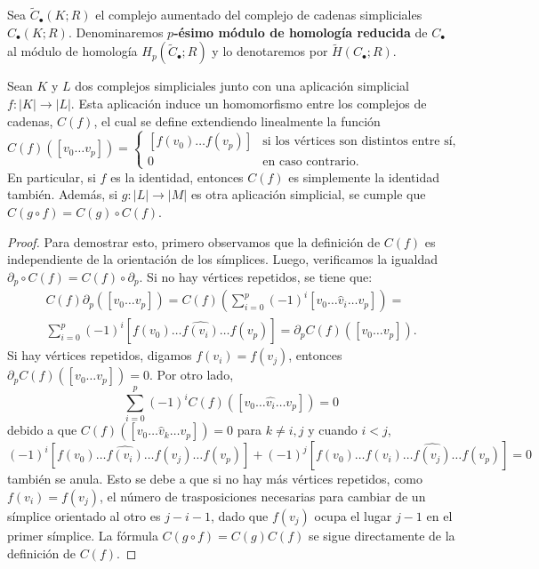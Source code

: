 \begin{definicion}
	Sea \(\widetilde{C}_{\bullet}(K;R)\) el complejo aumentado del complejo de cadenas
	simpliciales \(C_{\bullet}(K;R)\). Denominaremos \textbf{\(p\)-ésimo módulo de
	homología reducida} de \(C_{\bullet}\) al módulo de homología \(H_{p}(\widetilde{C}
	_{\bullet};R)\) y lo denotaremos por \(\widetilde{H}(C_{\bullet};R)\).
\end{definicion}

\begin{proposicion}
	\label{prop:simpl_app_hom} Sean \(K\) y \(L\) dos complejos simpliciales junto con
	una aplicación simplicial \(f: |K| \to |L|\). Esta aplicación induce un
	homomorfismo entre los complejos de cadenas, \(C(f)\), el cual se define
	extendiendo linealmente la función
	\[
		C(f)([v_{0} \ldots v_{p}]) =
		\begin{cases}
			[f(v_{0}) \ldots f(v_{p})] & \text{si los vértices son distintos entre sí}, \\
			0                         & \text{en caso contrario}.
		\end{cases}
	\]
	En particular, si \(f\) es la identidad, entonces \(C(f)\) es simplemente la
	identidad también. Además, si \(g: |L| \longrightarrow |M|\) es otra aplicación
	simplicial, se cumple que \(C(g \circ f) = C(g) \circ C(f)\).
\end{proposicion}
\begin{proof}
	Para demostrar esto, primero observamos que la definición de \(C(f)\) es
	independiente de la orientación de los símplices. Luego, verificamos la
	igualdad \(\partial_{p} \circ C(f) = C(f) \circ \partial_{p}\). Si no hay vértices
	repetidos, se tiene que:
	\begin{gather*}
		C(f) \partial_{p}([v_{0} \ldots v_{p}]) = C(f) \left( \sum_{i=0}^{p} (-1)^{i}
		[v_{0} \ldots \hat{v}_{i} \ldots v_{p}] \right) = \\ \sum_{i=0}^{p} (-1)^{i}
		[f(v_{0}) \ldots \widehat{f(v_i)}\ldots f(v_{p})] = \partial_{p} C(f)([v_{0}
		\ldots v_{p}]).
	\end{gather*}
	Si hay vértices repetidos, digamos \(f(v_{i}) = f(v_{j})\), entonces \(\partial_{p}
	C(f)([v_{0} \ldots v_{p}]) = 0\). Por otro lado,
	\[
		\sum_{i=0}^{p} (-1)^{i} C(f)([v_{0} \ldots \hat{v_i}\ldots v_{p}]) = 0
	\]
	debido a que \(C(f)([v_{0} \ldots \hat{v}_{k} \ldots v_{p}]) = 0\) para \(k \neq i,j\)
	y cuando \(i < j\),
	\[
		(-1)^{i} [f(v_{0}) \ldots \widehat{f(v_i)}\ldots f(v_{j}) \ldots f(v_{p})] +
		(-1)^{j} [f(v_{0}) \ldots f(v_{i}) \ldots \widehat{f(v_j)}\ldots f(v_{p})] =
		0
	\]
	también se anula. Esto se debe a que si no hay más vértices repetidos, como
	\(f(v_{i}) = f(v_{j})\), el número de trasposiciones necesarias para cambiar de un
	símplice orientado al otro es \(j-i-1\), dado que \(f(v_{j})\) ocupa el lugar
	\(j-1\) en el primer símplice. La fórmula \(C(g \circ f)=C(g)C(f)\) se sigue directamente
	de la definición de \(C(f)\).
\end{proof}

